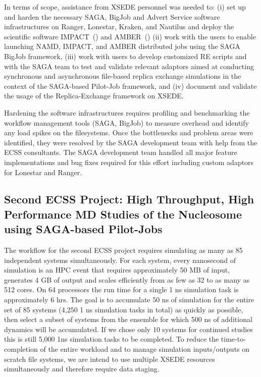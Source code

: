 \documentclass{sig-alternate}
\begin{document}
In terms of scope, assistance from XSEDE personnel was needed to: (i) set up and
harden the necessary SAGA, BigJob and Advert Service software infrastructures on
Ranger, Lonestar, Kraken, and Nautilus and deploy the scientific software
IMPACT~(\cite{IMPACT}) and AMBER~(\cite{AMBER}) (ii) work with the
users to enable launching NAMD, 
IMPACT, and AMBER distributed jobs using the
SAGA BigJob framework, (iii) work with users to develop customized RE scripts
and with the SAGA team to test and validate relevant adaptors aimed at
conducting synchronous and asynchronous ﬁle-based replica exchange simulations
in the context of the SAGA-based Pilot-Job framework, and (iv)  document and
validate the usage of the Replica-Exchange framework on XSEDE.

Hardening the software infrastructures requires profiling and benchmarking the
workflow management tools (SAGA, BigJob) to measure overhead and identify any
load spikes on the filesystems. Once the bottlenecks and problem areas were
identified, they were resolved by the SAGA development team with help from
the ECSS consultants. The SAGA development team handled all major feature
implementations and bug fixes required for this effort including custom
adaptors for Lonestar and Ranger. 

\subsection{Second ECSS Project: High Throughput, High Performance MD Studies of the Nucleosome
using SAGA-based Pilot-Jobs}

The workflow for the second ECSS project requires simulating as many as 85
independent systems simultaneously. For each system, every nanosecond of
simulation is an HPC event that requires approximately 50 MB of input, generates
4 GB of output and scales efficiently from as few as 32 to as many as 512 cores.
On 64 processors the run time for a single 1 ns simulation task is approximately
6 hrs. The goal is to accumulate 50 ns of simulation for the entire set of 85
systems (4,250 1 ns simulation tasks in total) as quickly as possible, then
select a subset of systems from the ensemble for which 500 ns of additional
dynamics will be accumulated. If we chose only 10 systems for continued studies
this is still 5,000 1ns simulation tasks to be completed. To reduce the
time-to-completion of the entire workload and to manage simulation
inputs/outputs on scratch file systems, we are intend to use multiple XSEDE
resources simultaneously and therefore require data staging.
\end{document}
